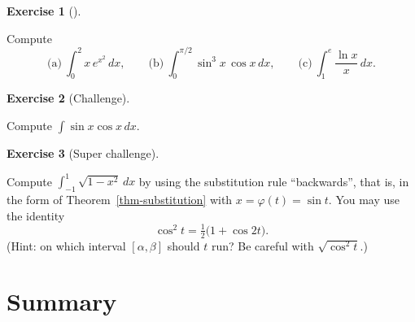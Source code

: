 \documentclass[
  letterpaper,
  DIV=11,
  numbers=noendperiod]{scrreprt}
\theoremstyle{plain}
\theoremstyle{plain}
\theoremstyle{definition}
\theoremstyle{definition}
\newtheorem{exercise}{Exercise}[chapter]
\theoremstyle{definition}
\theoremstyle{plain}
\theoremstyle{plain}
\theoremstyle{remark}
\begin{document}
\begin{exercise}[]\protect\hypertarget{exr-substitution-practice}{}\label{exr-substitution-practice}

Compute \[
\text{(a)}\ \int_0^2 x\,e^{x^2}\,dx, \qquad
\text{(b)}\ \int_0^{\pi/2}\sin^3x\,\cos x\,dx, \qquad
\text{(c)}\ \int_1^e\frac{\ln x}{x}\,dx .
\]

\end{exercise}

\begin{exercise}[Challenge]\protect\hypertarget{exr-sin-cos}{}\label{exr-sin-cos}

Compute \(\displaystyle\int\sin x\cos x\,dx\).

\end{exercise}

\begin{exercise}[Super
challenge]\protect\hypertarget{exr-semicircle-area}{}\label{exr-semicircle-area}

Compute \(\displaystyle\int_{-1}^1\sqrt{1-x^2}\,dx\) by using the
substitution rule ``backwards'', that is, in the form of
Theorem~\ref{thm-substitution} with \(x = \varphi(t) = \sin t\). You may
use the identity \[
\cos^2t = \tfrac12\big(1+\cos 2t\big).
\] (Hint: on which interval \([\alpha,\beta]\) should \(t\) run? Be
careful with \(\sqrt{\cos^2 t}\).)

\end{exercise}

\section{Summary}\label{summary-15}
\end{document}
